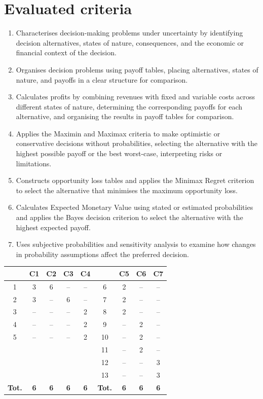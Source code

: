 \section*{Evaluated criteria}
\begin{enumerate}[label=\textbf{C\arabic*}]
\item Characterises decision-making problems under uncertainty by identifying decision alternatives, states of nature, consequences, and the economic or financial context of the decision.
\item Organises decision problems using payoff tables, placing alternatives, states of nature, and payoffs in a clear structure for comparison.
\item Calculates profits by combining revenues with fixed and variable costs across different states of nature, determining the corresponding payoffs for each alternative, and organising the results in payoff tables for comparison.
\item Applies the Maximin and Maximax criteria to make optimistic or conservative decisions without probabilities, selecting the alternative with the highest possible payoff or the best worst-case, interpreting risks or limitations.
\item Constructs opportunity loss tables and applies the Minimax Regret criterion to select the alternative that minimises the maximum opportunity loss.
\item Calculates Expected Monetary Value using stated or estimated probabilities and applies the Bayes decision criterion to select the alternative with the highest expected payoff.
\item Uses subjective probabilities and sensitivity analysis to examine how changes in probability assumptions affect the preferred decision.
\end{enumerate}

\begin{center}
	\small\setlength{\tabcolsep}{5pt}
	\begin{tabular}{|c|c|c|c|c||c|c|c|c|}
		\hline
		\textbf{\textnumero}&\textbf{C1}&\textbf{C2}&\textbf{C3}&\textbf{C4}&
		\textbf{\textnumero}&\textbf{C5}&\textbf{C6}&\textbf{C7}\\\hline
		1&3&6&--&--&6&2&--&--\\\hline
		2&3&--&6&--&7&2&--&--\\\hline
		3&--&--&--&2&8&2&--&--\\\hline
		4&--&--&--&2&9&--&2&--\\\hline
		5&--&--&--&2&10&--&2&--\\\hline
		&&&&&11&--&2&--\\\hline
		&&&&&12&--&--&3\\\hline
		&&&&&13&--&--&3\\\hline
		\textbf{Tot.}&\textbf{6}&\textbf{6}&\textbf{6}&\textbf{6}&
		\textbf{Tot.}&\textbf{6}&\textbf{6}&\textbf{6}\\\hline
	\end{tabular}
\end{center}

